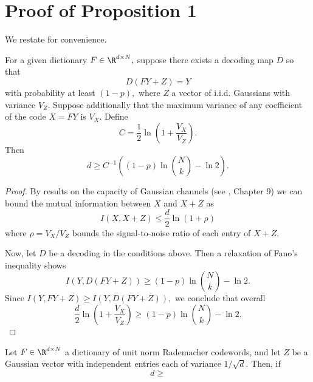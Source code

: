 \section{Proof of Proposition 1 \label{appendix:information}}

We restate  for convenience.

\begin{proposition*}
	For a given dictionary $F \in \R^{d \times N},$ suppose there exists a decoding map $D$ so that
	$$
		D(F Y + Z) = Y
	$$
	with probability at least $(1 - p),$ where $Z$ a vector of i.i.d. Gaussians with variance $V_Z.$ Suppose additionally that the maximum variance of any coefficient of the code $X = FY$ is $V_X.$ Define
	$$
		C = \frac 1 2 \ln \left( 1 + \frac {V_X}{V_Z} \right).
	$$
	Then
	$$
		d \geq C^{-1} \left( (1-p)\ln \binom{N}{k} - \ln 2 \right).
	$$
\end{proposition*}

\begin{proof}
	By results on the capacity of Gaussian channels (see \cite{thomas_elements_2006}, Chapter 9) we can bound the mutual information between $X$ and $X+Z$ as
	$$
		I(X, X + Z) \le \frac d 2 \ln(1 + \rho)
	$$
	where $\rho = V_X/V_Z$ bounds the signal-to-noise ratio of each entry of $X + Z.$

	Now, let $D$ be a decoding in the conditions above. Then a relaxation of Fano's inequality shows
	$$
		I(Y, D(FY + Z)) \ge (1 - p) \ln \binom N k - \ln 2.
	$$
	Since $I(Y, FY + Z) \ge I(Y, D(FY + Z)),$ we conclude that overall
	$$
		\frac d 2 \ln \left(1 + \frac {V_X} {V_Z} \right) \ge
		(1 - p) \ln \binom N k - \ln 2.
	$$
\end{proof}

\begin{proposition}
Let $F \in \R^{d \times N}$ a dictionary of unit norm Rademacher codewords, and let $Z$ be a Gaussian vector with independent entries each of variance $1/\sqrt d.$ Then, if
$$
d \ge
$$
\end{proposition}
